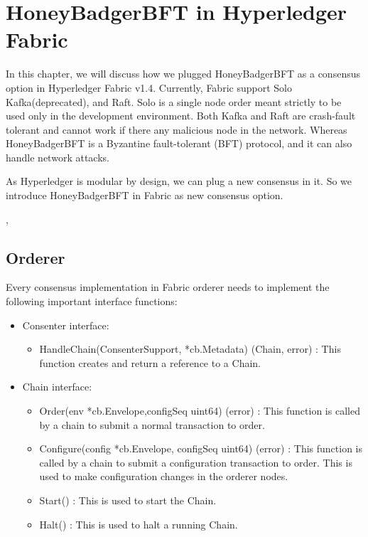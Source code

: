 \chapter{HoneyBadgerBFT in Hyperledger Fabric}
\label{ch:hbbftinfabric}
In this chapter, we will discuss how we plugged HoneyBadgerBFT as a consensus option in Hyperledger Fabric v1.4. Currently, Fabric support Solo Kafka(deprecated), and Raft. Solo is a single node order meant strictly to be used only in the development environment. Both Kafka and Raft are crash-fault tolerant and cannot work if there any malicious node in the network. Whereas HoneyBadgerBFT is a Byzantine fault-tolerant (BFT) protocol, and it can also handle network attacks. 

As Hyperledger is modular by design, we can plug a new consensus in it. So we introduce HoneyBadgerBFT in Fabric as new consensus option.


,



\section{Orderer}
Every consensus implementation in Fabric orderer needs to implement the following important interface functions:
\begin{itemize}
\item Consenter interface:
\begin{itemize}
    \item HandleChain(ConsenterSupport, *cb.Metadata) (Chain, error) : This function creates and return a reference to a Chain.
\end{itemize}
\item Chain interface:
\begin{itemize}
    \item Order(env *cb.Envelope,configSeq uint64) (error) : This function is called by a chain to submit a normal transaction to order.
\item Configure(config *cb.Envelope, configSeq uint64) (error) : This function is called by a chain to submit a configuration transaction to order. This is used to make configuration changes in the orderer nodes.
\item Start() : This is used to start the Chain.
\item Halt() : This is used to halt a running Chain.

\end{itemize}
    \end{itemize}
